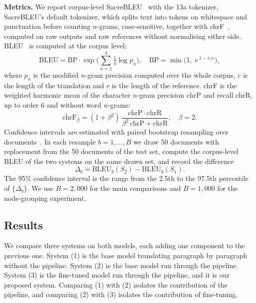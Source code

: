 \documentclass[conference]{IEEEtran}
\begin{document}
\textbf{Metrics.} We report corpus-level SacreBLEU~\cite{post2018sacrebleu} with the 13a tokenizer, SacreBLEU's default tokenizer, which splits text into tokens on whitespace and punctuation before counting $n$-grams, case-sensitive, together with chrF~\cite{popovic2015chrf}, computed on raw outputs and raw references without normalising either side. BLEU~\cite{papineni2002bleu} is computed at the corpus level:
\begin{equation}
\mathrm{BLEU} = \mathrm{BP}\cdot\exp\Big(\sum_{n=1}^{4}\tfrac{1}{4}\log p_n\Big),\quad \mathrm{BP}=\min\big(1,\;e^{\,1-r/c}\big),
\label{eq:bleu}
\end{equation}
where $p_n$ is the modified $n$-gram precision computed over the whole corpus, $c$ is the length of the translation and $r$ is the length of the reference. chrF is the weighted harmonic mean of the character $n$-gram precision $\mathrm{chrP}$ and recall $\mathrm{chrR}$, up to order 6 and without word $n$-grams:
\begin{equation}
\mathrm{chrF}_\beta = (1+\beta^2)\,\frac{\mathrm{chrP}\cdot\mathrm{chrR}}{\beta^2\,\mathrm{chrP}+\mathrm{chrR}},\quad \beta = 2.
\label{eq:chrf}
\end{equation}
Confidence intervals are estimated with paired bootstrap resampling over documents~\cite{koehn2004significance}. In each resample $b = 1,\dots,B$ we draw 50 documents with replacement from the 50 documents of the test set, compute the corpus-level BLEU of the two systems on the same drawn set, and record the difference
\begin{equation}
\Delta_b = \mathrm{BLEU}_b(S_2) - \mathrm{BLEU}_b(S_1).
\label{eq:boot}
\end{equation}
The 95\% confidence interval is the range from the 2.5th to the 97.5th percentile of $\{\Delta_b\}$. We use $B = 2{,}000$ for the main comparisons and $B = 1{,}000$ for the node-grouping experiment.

\subsection{Results}
We compare three systems on both models, each adding one component to the previous one. System (1) is the base model translating paragraph by paragraph without the pipeline. System (2) is the base model run through the pipeline. System (3) is the fine-tuned model run through the pipeline, and it is our proposed system. Comparing (1) with (2) isolates the contribution of the pipeline, and comparing (2) with (3) isolates the contribution of fine-tuning.
\end{document}
